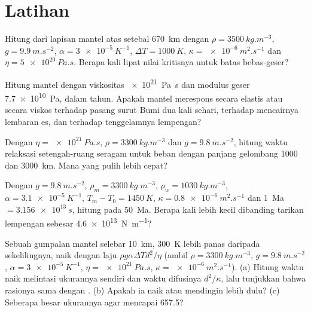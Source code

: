 \section{Latihan}

\begin{exercise}[$\star$]\label{exo:b3:mantle-convection:1}
Hitung  dari lapisan mantel atas setebal \qty{670}{km} dengan
$\rho = \qty{3500}{kg.m^{-3}}$, $g = \qty{9.9}{m.s^{-2}}$, $\alpha =
\qty{3e-5}{K^{-1}}$, $\Delta T = \qty{1000}{K}$, $\kappa =
\qty{e-6}{m^2.s^{-1}}$ dan $\eta = \qty{5e20}{Pa.s}$. Berapa kali lipat nilai kritisnya
untuk batas bebas-geser?
\end{exercise}

\begin{exercise}[$\star$]\label{exo:b3:mantle-convection:2}
Hitung  mantel dengan viskositas \qty{e21}{Pa.s} dan modulus geser
\qty{7.7e10}{Pa}, dalam tahun. Apakah mantel merespons secara elastis atau
secara viskos terhadap pasang surut Bumi dua kali sehari, terhadap mencairnya lembaran es, dan terhadap
tenggelamnya lempengan?
\end{exercise}

\begin{exercise}[$\star$]\label{exo:b3:mantle-convection:3}
Dengan $\eta = \qty{e21}{Pa.s}$, $\rho = \qty{3300}{kg.m^{-3}}$ dan $g =
\qty{9.8}{m.s^{-2}}$, hitung waktu relaksasi setengah-ruang seragam untuk
beban dengan panjang gelombang 1000 dan \qty{3000}{km}. Mana yang pulih lebih cepat?
\end{exercise}

\begin{exercise}[$\star$]\label{exo:b3:mantle-convection:4}
Dengan $g = \qty{9.8}{m.s^{-2}}$, $\rho_m = \qty{3300}{kg.m^{-3}}$, $\rho_w =
\qty{1030}{kg.m^{-3}}$, $\alpha = \qty{3.1e-5}{K^{-1}}$, $T_m - T_0 =
\qty{1450}{K}$, $\kappa = \qty{0.8e-6}{m^2.s^{-1}}$ dan \qty{1}{Ma} $=
\qty{3.156e13}{s}$, hitung  pada \qty{50}{Ma}. Berapa kali
lebih kecil dibanding tarikan lempengan sebesar \qty{4.6e13}{N.m^{-1}}?
\end{exercise}

\begin{exercise}[$\star\star$]\label{exo:b3:mantle-convection:5}
Sebuah gumpalan mantel selebar \qty{10}{km}, \qty{300}{K} lebih panas daripada
sekelilingnya, naik dengan laju $\rho g\alpha\Delta Td^2/\eta$ (ambil $\rho =
\qty{3300}{kg.m^{-3}}$, $g = \qty{9.8}{m.s^{-2}}$, $\alpha = \qty{3e-5}{K^{-1}}$,
$\eta = \qty{e21}{Pa.s}$, $\kappa = \qty{e-6}{m^2.s^{-1}}$). (a) Hitung
waktu naik melintasi ukurannya sendiri dan waktu difusinya $d^2/\kappa$, lalu tunjukkan
bahwa rasionya sama dengan . (b) Apakah ia naik atau mendingin lebih dulu? (c)
Seberapa besar ukurannya agar  mencapai 657.5?
\end{exercise}

